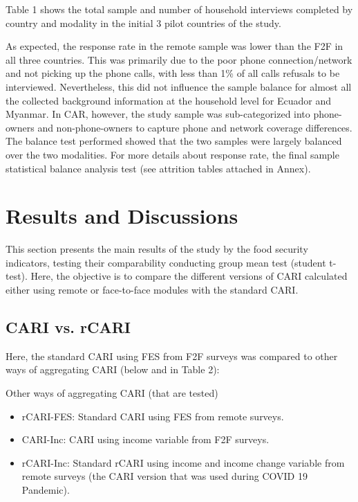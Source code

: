 \documentclass[11pt,harvard]{article}
\begin{document}
Table 1 shows the total sample and number of household interviews completed by country and modality in the initial 3 pilot countries of the study.
	
	 
	\label{tab:rCARI_Overall_Completion}
	
As expected, the response rate in the remote sample was lower than the F2F in all three countries. This was primarily due to the poor phone connection/network and not picking up the  phone calls, with less than 1\% of all calls refusals to be interviewed. Nevertheless, this did not influence the sample balance for almost all the collected background information at the household level for Ecuador and Myanmar. 
In CAR, however, the study sample was sub-categorized into phone-owners and non-phone-owners to capture phone and network coverage differences. The balance test performed showed that the two samples were largely balanced over the two modalities. For more details about response rate, the final sample statistical balance analysis test (see attrition tables attached in Annex).
	
	
\pagebreak
	
	\section{Results and Discussions}
	
This section presents the main results of the study by the food security indicators, testing their comparability conducting group mean test (student t-test). Here, the objective is to compare the different versions of CARI calculated either using remote or face-to-face modules with the standard CARI.
	
\subsection{CARI vs. rCARI}
	
Here, the standard CARI using FES from F2F surveys was compared to other ways of aggregating CARI (below and in Table 2):
	
	Other ways of aggregating CARI (that are tested)
	\begin{itemize}[label=--, left=1.5em]
		\item rCARI-FES: Standard CARI using FES from remote surveys.
		\item CARI-Inc: CARI using income variable from F2F surveys.
		\item rCARI-Inc: Standard rCARI using income and income change variable from remote surveys (the CARI version that was used during COVID 19 Pandemic).
	\end{itemize}
	
\end{document}
